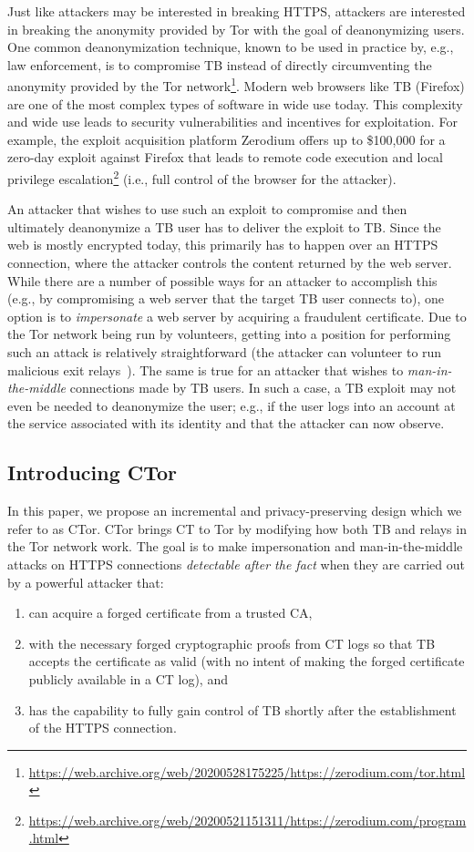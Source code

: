 Just like attackers may be interested in breaking HTTPS, attackers are
interested in breaking the anonymity provided by Tor with the goal of
deanonymizing users. One common deanonymization technique, known to be used in
practice by, e.g., law enforcement, is to compromise TB instead of directly
circumventing the anonymity provided by the Tor
network\footnote{\url{https://web.archive.org/web/20200528175225/https://zerodium.com/tor.html}}.
Modern web browsers like TB (Firefox) are one of the most complex types of
software in wide use today. This complexity and wide use leads to security
vulnerabilities and incentives for exploitation. For example, the exploit
acquisition platform Zerodium offers up to \$100,000 for a zero-day exploit
against Firefox that leads to remote code execution and local privilege
escalation\footnote{\url{https://web.archive.org/web/20200521151311/https://zerodium.com/program.html}}
(i.e., full control of the browser for the attacker).

An attacker that wishes to use such an exploit to compromise and then ultimately
deanonymize a TB user has to deliver the exploit to TB\@. Since the web is
mostly encrypted today, this primarily has to happen over an HTTPS connection,
where the attacker controls the content returned by the web server. While there
are a number of possible ways for an attacker to accomplish this (e.g., by
compromising a web server that the target TB user connects to), one option is to
\emph{impersonate} a web server by acquiring a fraudulent certificate. Due to
the Tor network being run by volunteers, getting into a position for performing
such an attack is relatively straightforward (the attacker can volunteer to run
malicious exit relays~\cite{spoiled-onions}). The same is true for an attacker that
wishes to \emph{man-in-the-middle} connections made by TB users. In such a case,
a TB exploit may not even be needed to deanonymize the user; e.g., if the user
logs into an account at the service associated with its identity and that the
attacker can now observe.

\subsection{Introducing CTor}
In this paper, we propose an incremental and privacy-preserving design which we
refer to as CTor. CTor brings CT to Tor by modifying how both TB and relays in
the Tor network work. The goal is to make impersonation and man-in-the-middle
attacks on HTTPS connections \emph{detectable after the fact} when they are
carried out by a powerful attacker that:
\begin{enumerate}
	\item can acquire a forged certificate from a trusted CA,
	\item with the necessary forged cryptographic proofs from CT logs so that TB
	accepts the certificate as valid (with no intent of making the forged
	certificate publicly available in a CT log), and
	\item has the capability to fully gain control of TB shortly after the
	establishment of the HTTPS connection.
\end{enumerate}


